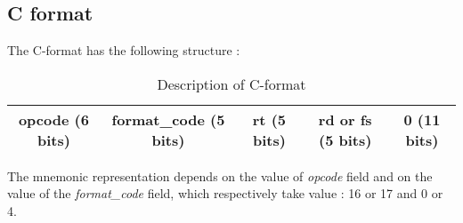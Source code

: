 \subsection*{C format}

	The C-format has the following structure :
	\begin{table}[H]
		\centering
		\begin{tabular}{|c|c|c|c|c|}
		\hline 
		opcode (6 bits) & format\_code (5 bits) & rt (5 bits) & rd or fs (5 bits) & 0 (11 bits) \\ 
		\hline 
		\end{tabular} 
		\caption{Description of C-format}
	\end{table}
	
	The mnemonic representation depends on the value of \textit{opcode} field and on the value of the \textit{format\_code} field, which respectively take value : 16 or 17 and 0 or 4.